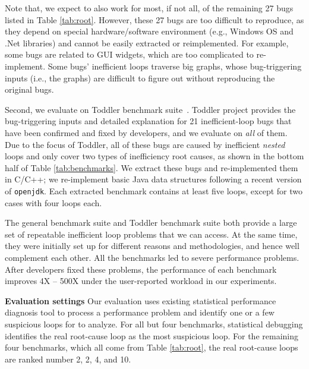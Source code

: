 Note that, we expect \Tool to also work for most, if not all, of 
the remaining 27 bugs listed in Table \ref{tab:root}.
However, these 27 bugs are too difficult to reproduce, as they 
depend on special hardware/software environment (e.g., Windows OS and 
.Net libraries) and cannot be easily extracted or reimplemented. 
For example, some bugs are related to GUI widgets, which are too complicated to 
re-implement. Some bugs' inefficient 
loops traverse big graphs, whose bug-triggering inputs
(i.e., the graphs) are difficult to figure out 
without reproducing the original bugs. 

Second, we evaluate \Tool on Toddler benchmark suite~\cite{Alabama, toddlerbuglist}.
Toddler project provides the bug-triggering inputs and detailed explanation
for 21 inefficient-loop bugs that have been confirmed and fixed by developers, and
we evaluate \Tool on \emph{all} of them.
Due to the focus of Toddler, all of these bugs are caused by inefficient
\textit{nested} loops and only cover two types of inefficiency root causes,
as shown in the bottom half of Table \ref{tab:benchmarks}.
We extract these bugs and re-implemented them in 
C/C++;
we re-implement basic Java data structures following a recent version of 
\texttt{openjdk}. Each extracted benchmark contains at least five
loops, except for two cases with four loops each.

The general benchmark suite and Toddler benchmark suite both provide
a large set of repeatable inefficient loop problems that we can access. 
At the same time, they were initially set up for different reasons and
methodologies,
and hence well complement each other.
All the benchmarks led to severe performance problems.
After developers fixed these problems, the performance of each benchmark improves
4X -- 500X under the user-reported workload in our experiments. 


\noindent\textbf{Evaluation settings}
Our evaluation uses existing statistical performance diagnosis
tool \cite{SongOOPSLA2014} to process a performance problem and identify 
one or a few suspicious loops for \Tool to analyze.
For all but four benchmarks, statistical debugging identifies the
real root-cause loop as the most suspicious loop. For the remaining four
benchmarks, which all come from Table \ref{tab:root},
the real root-cause loops are ranked number 2, 2, 4, and 10.

